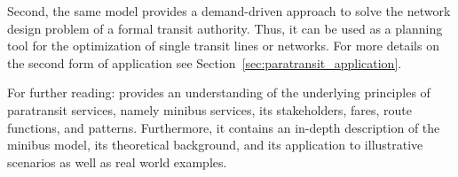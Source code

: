 Second, the same model provides a demand-driven approach to solve the network design problem of a formal transit authority. Thus, it can be used as a planning tool for the optimization of single transit lines or networks. For more details on the second form of application see Section~\ref{sec:paratransit_application}.

For further reading: \citet[][]{Neumann_PhDThesis_2014} provides an understanding of the underlying principles of paratransit services, namely minibus services, its stakeholders, fares, route functions, and patterns. Furthermore, it contains an in-depth description of the minibus model, its theoretical background, and its application to illustrative scenarios as well as real world examples.




